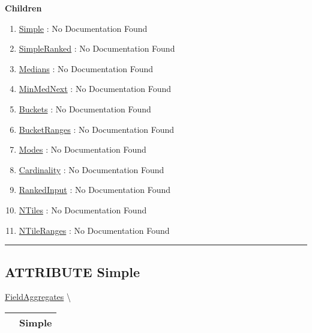 \textbf{Children}
\begin{enumerate}
\item \hyperlink{ecldoc:ml_core.fieldaggregates.simple}{Simple}
: No Documentation Found
\item \hyperlink{ecldoc:ml_core.fieldaggregates.simpleranked}{SimpleRanked}
: No Documentation Found
\item \hyperlink{ecldoc:ml_core.fieldaggregates.medians}{Medians}
: No Documentation Found
\item \hyperlink{ecldoc:ml_core.fieldaggregates.minmednext}{MinMedNext}
: No Documentation Found
\item \hyperlink{ecldoc:ml_core.fieldaggregates.buckets}{Buckets}
: No Documentation Found
\item \hyperlink{ecldoc:ml_core.fieldaggregates.bucketranges}{BucketRanges}
: No Documentation Found
\item \hyperlink{ecldoc:ml_core.fieldaggregates.modes}{Modes}
: No Documentation Found
\item \hyperlink{ecldoc:ml_core.fieldaggregates.cardinality}{Cardinality}
: No Documentation Found
\item \hyperlink{ecldoc:ml_core.fieldaggregates.rankedinput}{RankedInput}
: No Documentation Found
\item \hyperlink{ecldoc:ml_core.fieldaggregates.ntiles}{NTiles}
: No Documentation Found
\item \hyperlink{ecldoc:ml_core.fieldaggregates.ntileranges}{NTileRanges}
: No Documentation Found
\end{enumerate}

\rule{\linewidth}{0.5pt}

\subsection*{\textsf{\colorbox{headtoc}{\color{white} ATTRIBUTE}
Simple}}

\hypertarget{ecldoc:ml_core.fieldaggregates.simple}{}
\hspace{0pt} \hyperlink{ecldoc:ml_core.fieldaggregates}{FieldAggregates} \textbackslash 

{\renewcommand{\arraystretch}{1.5}
\begin{tabularx}{\textwidth}{|>{\raggedright\arraybackslash}l|X|}
\hline
\hspace{0pt}\mytexttt{\color{red} } & \textbf{Simple} \\
\hline
\end{tabularx}
}

